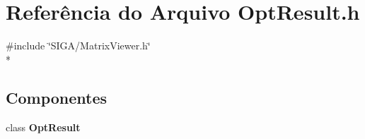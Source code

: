 \section{Referência do Arquivo Opt\+Result.\+h}
\label{_opt_result_8h}
{\ttfamily \#include \char`\"{}S\+I\+G\+A/\+Matrix\+Viewer.\+h\char`\"{}}\\*
\subsection*{Componentes}
\begin{DoxyCompactItemize}
\item 
class {\bf Opt\+Result}
\end{DoxyCompactItemize}
